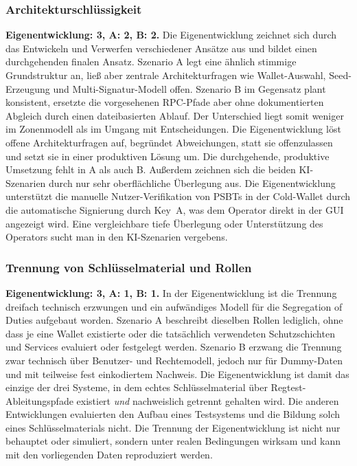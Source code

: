 \subsubsection{Architekturschlüssigkeit}
\textbf{Eigenentwicklung: 3, A: 2, B: 2.} Die Eigenentwicklung zeichnet sich durch das Entwickeln und Verwerfen verschiedener Ansätze aus und bildet einen durchgehenden finalen Ansatz.
Szenario A legt eine ähnlich stimmige Grundstruktur an, ließ aber zentrale Architekturfragen wie Wallet-Auswahl, Seed-Erzeugung und Multi-Signatur-Modell offen.
Szenario B im Gegensatz plant konsistent, ersetzte die vorgesehenen \ac{RPC}-Pfade aber ohne dokumentierten Abgleich durch einen dateibasierten Ablauf. Der Unterschied liegt somit weniger im Zonenmodell als im Umgang mit Entscheidungen.
Die Eigenentwicklung löst offene Architekturfragen auf, begründet Abweichungen, statt sie offenzulassen und setzt sie in einer produktiven Lösung um. Die durchgehende, produktive Umsetzung fehlt in A als auch B.
Außerdem zeichnen sich die beiden \ac{KI}-Szenarien durch nur sehr oberflächliche Überlegung aus. Die Eigenentwicklung unterstützt die manuelle Nutzer-Verifikation von \acp{PSBT} in der Cold-Wallet durch die automatische Signierung durch Key~A, was dem Operator direkt in der \ac{GUI} angezeigt wird. 
Eine vergleichbare tiefe Überlegung oder Unterstützung des Operators sucht man in den \ac{KI}-Szenarien vergebens.

\subsubsection{Trennung von Schlüsselmaterial und Rollen}
\textbf{Eigenentwicklung: 3, A: 1, B: 1.} In der Eigenentwicklung ist die Trennung dreifach technisch erzwungen und ein aufwändiges Modell für die Segregation of Duties aufgebaut worden.
Szenario A beschreibt dieselben Rollen lediglich, ohne dass je eine Wallet existierte oder die tatsächlich verwendeten Schutzschichten und Services evaluiert oder festgelegt werden.
Szenario B erzwang die Trennung zwar technisch über Benutzer- und Rechtemodell, jedoch nur für Dummy-Daten und mit teilweise fest einkodiertem Nachweis. Die Eigenentwicklung ist damit das einzige der drei Systeme, in dem echtes Schlüsselmaterial über Regtest-Ableitungspfade existiert \emph{und} nachweislich getrennt gehalten wird. Die anderen Entwicklungen evaluierten den Aufbau eines Testsystems und die Bildung solch eines Schlüsselmaterials nicht.
Die Trennung der Eigenentwicklung ist nicht nur behauptet oder simuliert, sondern unter realen Bedingungen wirksam und kann mit den vorliegenden Daten reproduziert werden.


